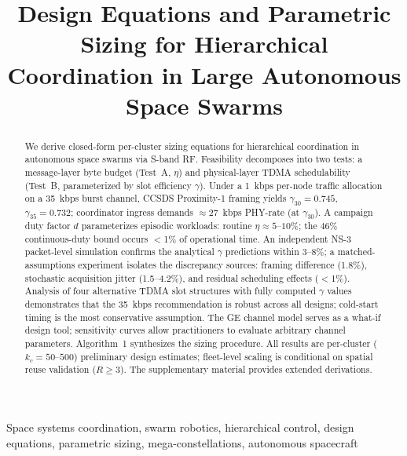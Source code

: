 \documentclass[journal]{IEEEtran}
\begin{document}
\title{Design Equations and Parametric Sizing for Hierarchical Coordination in Large Autonomous Space Swarms}

\author{
}


\maketitle

\begin{abstract}
We derive closed-form per-cluster sizing equations for hierarchical coordination in autonomous space swarms via S-band RF. Feasibility decomposes into two tests: a message-layer byte budget (Test~A, $\eta$) and physical-layer TDMA schedulability (Test~B, parameterized by slot efficiency $\gamma$). Under a 1~kbps per-node traffic allocation on a 35~kbps burst channel, CCSDS Proximity-1 framing yields $\gamma_{30} = 0.745$, $\gamma_{35} = 0.732$; coordinator ingress demands ${\approx}27$~kbps PHY-rate (at $\gamma_{30}$). A campaign duty factor $d$ parameterizes episodic workloads: routine $\eta \approx 5$--$10\%$; the $46\%$ continuous-duty bound occurs $<$1\% of operational time. An independent NS-3 packet-level simulation confirms the analytical $\gamma$ predictions within 3--8\%; a matched-assumptions experiment isolates the discrepancy sources: framing difference (1.8\%), stochastic acquisition jitter (1.5--4.2\%), and residual scheduling effects ($<$1\%). Analysis of four alternative TDMA slot structures with fully computed $\gamma$ values demonstrates that the 35~kbps recommendation is robust across all designs; cold-start timing is the most conservative assumption. The GE channel model serves as a what-if design tool; sensitivity curves allow practitioners to evaluate arbitrary channel parameters. Algorithm~1 synthesizes the sizing procedure. All results are per-cluster ($k_c = 50$--$500$) preliminary design estimates; fleet-level scaling is conditional on spatial reuse validation ($R \geq 3$). The supplementary material provides extended derivations.
\end{abstract}

\begin{IEEEkeywords}
Space systems coordination, swarm robotics, hierarchical control, design equations, parametric sizing, mega-constellations, autonomous spacecraft
\end{IEEEkeywords}
\end{document}
